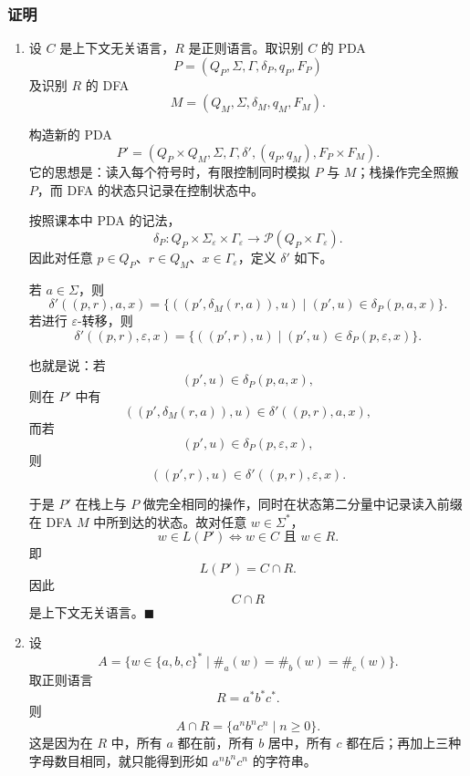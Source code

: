 \begin{answerred}
\subsubsection*{证明}

\begin{enumerate}[label=(\alph*), leftmargin=2.5em]
    \item 设 $C$ 是上下文无关语言，$R$ 是正则语言。取识别 $C$ 的 PDA
    \[
        P=(Q_P,\Sigma,\Gamma,\delta_P,q_P,F_P)
    \]
    及识别 $R$ 的 DFA
    \[
        M=(Q_M,\Sigma,\delta_M,q_M,F_M).
    \]

    构造新的 PDA
    \[
        P'=(Q_P\times Q_M,\Sigma,\Gamma,\delta',(q_P,q_M),F_P\times F_M).
    \]
    它的思想是：读入每个符号时，有限控制同时模拟 $P$ 与 $M$；栈操作完全照搬 $P$，而 DFA 的状态只记录在控制状态中。

    按照课本中 PDA 的记法，
    \[
        \delta_P:Q_P\times \Sigma_\varepsilon\times \Gamma_\varepsilon
        \to
        \mathcal{P}(Q_P\times \Gamma_\varepsilon).
    \]
    因此对任意 $p\in Q_P$、$r\in Q_M$、$x\in \Gamma_\varepsilon$，定义 $\delta'$ 如下。

    若 $a\in\Sigma$，则
    \[
        \delta'((p,r),a,x)
        =
        \{((p',\delta_M(r,a)),u)\mid (p',u)\in \delta_P(p,a,x)\}.
    \]
    若进行 $\varepsilon$-转移，则
    \[
        \delta'((p,r),\varepsilon,x)
        =
        \{((p',r),u)\mid (p',u)\in \delta_P(p,\varepsilon,x)\}.
    \]

    也就是说：若
    \[
        (p',u)\in \delta_P(p,a,x),
    \]
    则在 $P'$ 中有
    \[
        ((p',\delta_M(r,a)),u)\in \delta'((p,r),a,x),
    \]
    而若
    \[
        (p',u)\in \delta_P(p,\varepsilon,x),
    \]
    则
    \[
        ((p',r),u)\in \delta'((p,r),\varepsilon,x).
    \]

    于是 $P'$ 在栈上与 $P$ 做完全相同的操作，同时在状态第二分量中记录读入前缀在 DFA $M$ 中所到达的状态。故对任意 $w\in\Sigma^*$，
    \[
        w\in L(P')
        \iff
        w\in C\text{ 且 }w\in R.
    \]
    即
    \[
        L(P')=C\cap R.
    \]
    因此
    \[
        C\cap R
    \]
    是上下文无关语言。$\blacksquare$

    \item 设
    \[
        A=\{w\in\{a,b,c\}^*\mid \#_a(w)=\#_b(w)=\#_c(w)\}.
    \]
    取正则语言
    \[
        R=a^*b^*c^*.
    \]
    则
    \[
        A\cap R=\{a^n b^n c^n\mid n\ge 0\}.
    \]
    这是因为在 $R$ 中，所有 $a$ 都在前，所有 $b$ 居中，所有 $c$ 都在后；再加上三种字母数目相同，就只能得到形如 $a^n b^n c^n$ 的字符串。


\end{enumerate}
\end{answerred}
